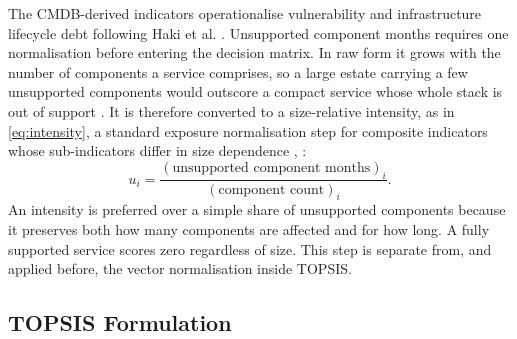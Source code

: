 \documentclass[
  journal,
]{IEEEtran}%
\begin{document}
The CMDB-derived indicators operationalise vulnerability and
infrastructure lifecycle debt following Haki et al.
. Unsupported
component months requires one normalisation before entering the decision
matrix. In raw form it grows with the number of components a service
comprises, so a large estate carrying a few unsupported components would
outscore a compact service whose whole stack is out of support
. It is
therefore converted to a size-relative intensity, as in
\eqref{eq:intensity}, a standard exposure normalisation step for
composite indicators whose sub-indicators differ in size dependence
,
:
\begin{equation}\label{eq:intensity}
u_i = \frac{(\text{unsupported component months})_i}{(\text{component count})_i}.
\end{equation} An intensity is preferred over a simple share of
unsupported components because it preserves both how many components are
affected and for how long. A fully supported service scores zero
regardless of size. This step is separate from, and applied before, the
vector normalisation inside TOPSIS.

\subsection{TOPSIS Formulation}\label{sec-topsis}
\end{document}
